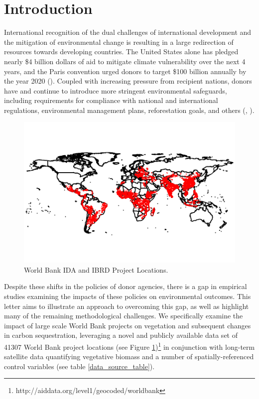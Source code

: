 \documentclass{article}\usepackage[]{graphicx}\usepackage[]{color}
\makeatletter
\def\maxwidth{ %
  \ifdim\Gin@nat@width>\linewidth
    \linewidth
  \else
    \Gin@nat@width
  \fi
}
\newenvironment{knitrout}{}{}  %
\makeatother
\begin{document}
\begin{knitrout}
\newpage
\section{Introduction}

International recognition of the dual challenges of international development and the mitigation of environmental change is resulting in a large redirection of resources towards developing countries. 
The United States alone has pledged nearly \$4 billion dollars of aid to mitigate climate vulnerability over the next 4 years, and the Paris convention urged donors to target \$100 billion annually by the year 2020 (\cite{royal_united_2015}). 
Coupled with increasing pressure from recipient nations, donors have and continue to introduce more stringent environmental safeguards, including requirements for compliance with national and international regulations, environmental management plans, reforestation goals, and others (\cite{nielson_delegation_2003}, \cite{gutner_explaining_2005}).

\begin{figure}\centering
\begin{Schunk}

\includegraphics[width=\maxwidth]{figure/WLocs-1} \end{Schunk}
\caption{World Bank IDA and IBRD Project Locations.}
\label{WBLocs}
\vspace{25pt}
\end{figure}  

\par

Despite these shifts in the policies of donor agencies, there is a gap in empirical studies examining the impacts of these policies on environmental outcomes.  
This letter aims to illustrate an approach to overcoming this gap, as well as highlight many of the remaining methodological challenges.
We specifically examine the impact of large scale World Bank projects on vegetation and subsequent changes in carbon sequestration, leveraging a novel and publicly available data set of 41307 World Bank project locations (see Figure \ref{WBLocs})\footnote{http://aiddata.org/level1/geocoded/worldbank} in conjunction with long-term satellite data quantifying vegetative biomass and a number of spatially-referenced control variables (see table \ref{data_source_table}).


\end{knitrout}
\end{document}
